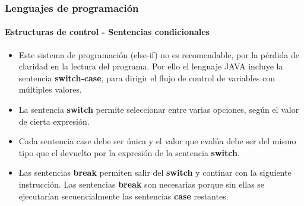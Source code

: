 \documentclass{beamer}
\begin{document}
		\begin{frame}
			\frametitle{Lenguajes de programaci\'on}
			\framesubtitle{Estructuras de control - Sentencias condicionales}

			\begin{itemize}
				\item Este sistema de programaci\'on (else-if) no es recomendable, por la p\'erdida de claridad en la lectura del programa. Por ello el lenguaje JAVA incluye la sentencia \textbf{switch-case}, para dirigir el flujo de control de variables con m\'ultiples valores.
				\item La sentencia \textbf{switch} permite seleccionar entre varias opciones, seg\'un el valor de cierta expresi\'on.
				\item Cada sentencia case debe ser \'unica y el valor que eval\'ua debe ser del mismo tipo que el devuelto por la expresi\'on de la sentencia \textbf{switch}.
				\item Las sentencias \textbf{break} permiten salir del \textbf{switch} y continar con la siguiente instrucci\'on. Las sentencias \textbf{break} son necesarias porque sin ellas se ejecutar\'ian secuencialmente las sentencias \textbf{case} restantes. 
			\end{itemize}
		\end{frame}
\end{document}
